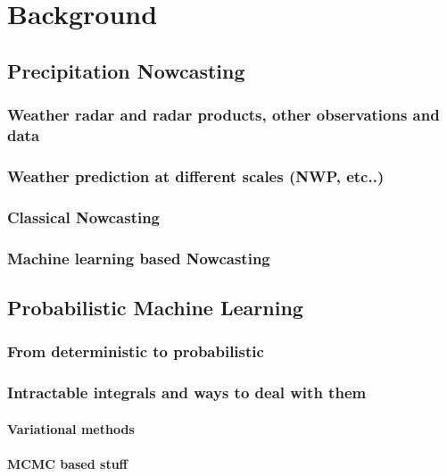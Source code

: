 \chapter{Background}
\label{chapter:background} 

\section{Precipitation Nowcasting}

\subsection{Weather radar and radar products, other observations and data}

\subsection{Weather prediction at different scales (NWP, etc..)}

\subsection{Classical Nowcasting}

\subsection{Machine learning based Nowcasting}


\section{Probabilistic Machine Learning}

\subsection{From deterministic to probabilistic}

\subsection{Intractable integrals and ways to deal with them}
\subsubsection{Variational methods}
\subsubsection{MCMC based stuff}
